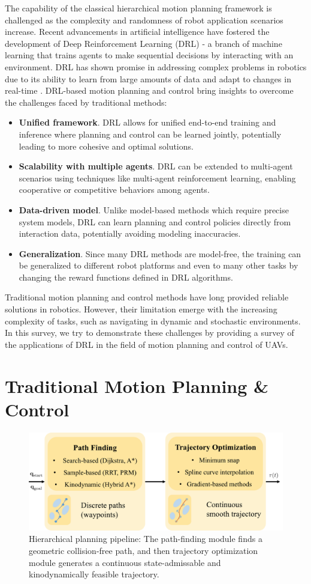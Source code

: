 \documentclass{article}
\newcommand{\TB}[1]{\textbf{#1}}
\begin{document}
The capability of the 
classical hierarchical motion planning framework is 
challenged 
as the complexity and randomness of robot application 
scenarios increase. 
Recent advancements in artificial intelligence have fostered 
the development of Deep Reinforcement Learning (DRL) - a branch 
of machine learning that trains agents to make sequential 
decisions by interacting with an environment. DRL has shown 
promise in addressing complex problems in robotics 
due to its ability to learn from large 
amounts of data and adapt to changes in real-time
\parencite{hwangbo2017control}.
DRL-based motion planning and control bring insights to 
overcome the challenges faced by traditional methods: 
\begin{itemize}
  \item \TB{Unified framework}. DRL allows for unified end-to-end 
  training and inference where planning and control can be 
  learned 
  jointly, potentially leading to more cohesive and optimal 
  solutions.
  \item \TB{Scalability with multiple agents}.  DRL can be 
  extended to multi-agent scenarios using techniques like 
  multi-agent reinforcement learning, enabling cooperative or 
  competitive behaviors among agents.
  \item \TB{Data-driven model}. Unlike model-based methods which 
  require precise system models, DRL can learn planning and  
  control policies directly from interaction data, potentially  
  avoiding modeling inaccuracies.
  \item \TB{Generalization}. Since many DRL methods are 
  model-free, the training can be generalized to different 
  robot platforms and even to many other tasks by changing 
  the reward functions defined in DRL algorithms.
\end{itemize}


Traditional motion planning and control methods have long 
provided 
reliable solutions in robotics. 
However, their limitation emerge with the increasing complexity of tasks, 
such as 
navigating in dynamic and stochastic environments.
In this survey, we try to demonstrate these challenges by providing 
a survey of the applications of DRL in the field 
of motion planning and control of UAVs.

\section{Traditional Motion Planning \& Control}

\begin{figure}[h]
  \centering
  \includegraphics[width=.5\textwidth]{frontback.png}
  \caption{Hierarchical planning pipeline: The path-finding module 
finds a geometric collision-free path, and then trajectory
optimization module generates a continuous state-admissable and kinodynamically
feasible trajectory.}
  \label{fig:concept}
\end{figure}
\end{document}

